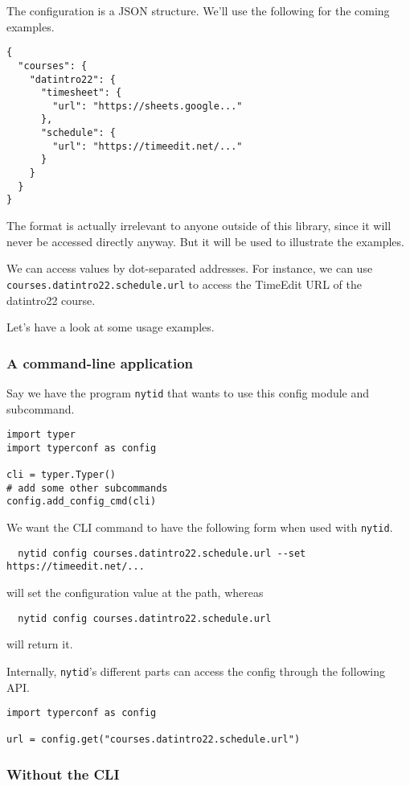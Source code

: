 The configuration is a JSON structure.
We'll use the following for the coming examples.
\label{ConfigStructure}
\begin{verbatim}
{
  "courses": {
    "datintro22": {
      "timesheet": {
        "url": "https://sheets.google..."
      },
      "schedule": {
        "url": "https://timeedit.net/..."
      }
    }
  }
}
\end{verbatim}
The format is actually irrelevant to anyone outside of this library, since it 
will never be accessed directly anyway.
But it will be used to illustrate the examples.

We can access values by dot-separated addresses.
For instance, we can use \texttt{courses.datintro22.schedule.url} to access the 
TimeEdit URL of the datintro22 course.

Let's have a look at some usage examples.

\subsubsection{A command-line application}

Say we have the program \texttt{nytid} that wants to use this config module and 
subcommand.
\begin{verbatim}
import typer
import typerconf as config

cli = typer.Typer()
# add some other subcommands
config.add_config_cmd(cli)
\end{verbatim}

We want the CLI command to have the following form when used with \texttt{nytid}.
\begin{verbatim}
  nytid config courses.datintro22.schedule.url --set https://timeedit.net/...
\end{verbatim}
will set the configuration value at the path, whereas
\begin{verbatim}
  nytid config courses.datintro22.schedule.url
\end{verbatim}
will return it.

Internally, \texttt{nytid}'s different parts can access the config through the 
following API.
\begin{verbatim}
import typerconf as config

url = config.get("courses.datintro22.schedule.url")
\end{verbatim}

\subsubsection{Without the CLI}

